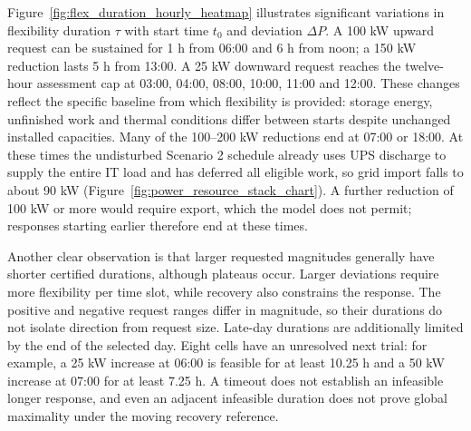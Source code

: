 \documentclass[lettersize,journal]{IEEEtran}
\begin{document}
Figure~\ref{fig:flex_duration_hourly_heatmap} illustrates significant variations in flexibility duration $\tau$ with start time $t_0$ and deviation $\Delta P$. A 100 kW upward request can be sustained for 1 h from 06:00 and 6 h from noon; a 150 kW reduction lasts 5 h from 13:00. A 25 kW downward request reaches the twelve-hour assessment cap at 03:00, 04:00, 08:00, 10:00, 11:00 and 12:00. These changes reflect the specific baseline from which flexibility is provided: storage energy, unfinished work and thermal conditions differ between starts despite unchanged installed capacities. Many of the 100--200 kW reductions end at 07:00 or 18:00. At these times the undisturbed Scenario 2 schedule already uses UPS discharge to supply the entire IT load and has deferred all eligible work, so grid import falls to about 90 kW (Figure~\ref{fig:power_resource_stack_chart}). A further reduction of 100 kW or more would require export, which the model does not permit; responses starting earlier therefore end at these times.

Another clear observation is that larger requested magnitudes generally have shorter certified durations, although plateaus occur. Larger deviations require more flexibility per time slot, while recovery also constrains the response. The positive and negative request ranges differ in magnitude, so their durations do not isolate direction from request size. Late-day durations are additionally limited by the end of the selected day. Eight cells have an unresolved next trial: for example, a 25 kW increase at 06:00 is feasible for at least 10.25 h and a 50 kW increase at 07:00 for at least 7.25 h. A timeout does not establish an infeasible longer response, and even an adjacent infeasible duration does not prove global maximality under the moving recovery reference.
\end{document}
